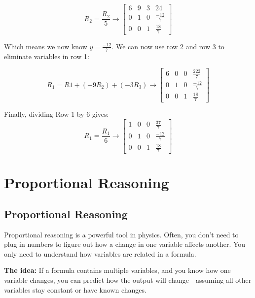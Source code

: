 \begin{mdframed}[backgroundcolor=blue!10!white]
\begin{equation*}
	R_2 = \frac{R_2}{5}   
	\longrightarrow
	\begin{bmatrix}
		6 & 9 & 3 & 24 \\
		0 & 1 & 0 & \frac{-12}{7}\\
		0 & 0 & 1 & \frac{18}{7} 
	\end{bmatrix} 	
\end{equation*}

Which means we now know $y = \frac{-12}{7}$.  We can now use row 2 and row 3 to eliminate variables in row 1:  

\begin{equation*}
	R_1 = R1 + (-9 R_2) + (-3 R_3)  
	\longrightarrow
	\begin{bmatrix}
		6 & 0 & 0 & \frac{222}{7} \\
		0 & 1 & 0 & \frac{-12}{7}\\
		0 & 0 & 1 & \frac{18}{7} 
	\end{bmatrix} 	
\end{equation*}

Finally, dividing Row 1 by 6 gives: 
\begin{equation*}
	R_1 = \frac{R_1}{6}
	\longrightarrow
	\begin{bmatrix}
		1 & 0 & 0 & \frac{37}{7} \\
		0 & 1 & 0 & \frac{-12}{7}\\
		0 & 0 & 1 & \frac{18}{7} 
	\end{bmatrix} 	
\end{equation*}


\end{mdframed}



\newpage
\section{Proportional Reasoning}
\subsection{Proportional Reasoning}

Proportional reasoning is a powerful tool in physics. Often, you don’t need to plug in numbers to figure out how a change in one variable affects another. You only need to understand how variables are related in a formula.

\textbf{The idea:} If a formula contains multiple variables, and you know how one variable changes, you can predict how the output will change—assuming all other variables stay constant or have known changes.



